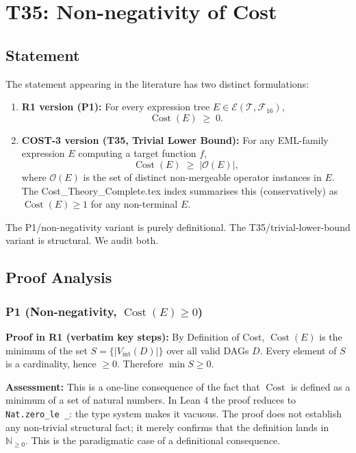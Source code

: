 \documentclass[12pt,a4paper]{article}
\theoremstyle{definition}
\newcommand{\Cost}{\operatorname{Cost}}
\newcommand{\Fam}{\mathcal{F}}
\begin{document}
\section{T35: Non-negativity of Cost}

\subsection{Statement}

The statement appearing in the literature has two distinct formulations:

\begin{enumerate}
  \item \textbf{R1 version (P1):}  For every expression tree
        $E \in \mathcal{E}(\mathcal{T},\Fam_{16})$,
        \[
          \Cost(E) \;\geq\; 0.
        \]
  \item \textbf{COST-3 version (T35, Trivial Lower Bound):}
        For any EML-family expression $E$ computing a target function $f$,
        \[
          \Cost(E) \;\geq\; |\mathcal{O}(E)|,
        \]
        where $\mathcal{O}(E)$ is the set of distinct non-mergeable operator
        instances in $E$.  The Cost\_Theory\_Complete.tex index summarises this
        (conservatively) as $\Cost(E) \geq 1$ for any non-terminal $E$.
\end{enumerate}

The P1/non-negativity variant is purely definitional.  The T35/trivial-lower-bound
variant is structural.  We audit both.

\subsection{Proof Analysis}

\subsubsection{P1 (Non-negativity, $\Cost(E) \geq 0$)}

\textbf{Proof in R1 (verbatim key steps):}
By Definition of Cost, $\Cost(E)$ is the minimum of the set
$S = \{|V_{\mathrm{int}}(D)|\}$ over all valid DAGs $D$.  Every element of
$S$ is a cardinality, hence $\geq 0$.  Therefore $\min S \geq 0$.

\textbf{Assessment:}  This is a one-line consequence of the fact that
$\Cost$ is defined as a minimum of a set of natural numbers.  In Lean 4 the
proof reduces to \texttt{Nat.zero\_le \_}: the type system makes it
vacuous.  The proof does not establish any non-trivial structural fact;
it merely confirms that the definition lands in $\mathbb{N}_{\geq 0}$.
This is the paradigmatic case of a definitional consequence.
\end{document}
